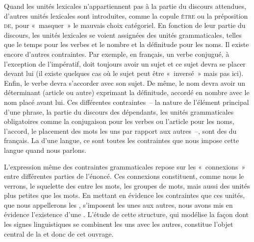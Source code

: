 Quand les unités lexicales n’appartiennent pas à la partie du discours attendues, d’autres unités lexicales sont introduites, comme la copule \textsc{être} ou la préposition \textsc{de}, pour «~masquer~» le mauvais choix catégoriel. En fonction de leur partie du discours, les unités lexicales se voient assignées des unités grammaticales, telles que le temps pour les verbes et le nombre et la définitude pour les noms. Il existe encore d’autres contraintes. Par exemple, en français, un verbe conjugué, à l’exception de l’impératif, doit toujours avoir un sujet et ce sujet devra se placer devant lui (il existe quelques cas où le sujet peut être «~inversé~» mais pas ici). Enfin, le verbe devra s’accorder avec son sujet. De même, le nom devra avoir un déterminant (article ou autre) exprimant la définitude, accordé en nombre avec le nom placé avant lui. Ces différentes contraintes~– la nature de l’élément principal d’une phrase, la partie du discours des dépendants, les unités grammaticales obligatoires comme la conjugaison pour les verbes ou l’article pour les noms, l’accord, le placement des mots les uns par rapport aux autres~–, sont des  du français. La  d’une langue, ce sont toutes les contraintes que nous impose cette langue quand nous parlons.

L’expression même des contraintes grammaticales repose sur les «~connexions~» entre différentes parties de l’énoncé. Ces connexions constituent, comme nous le verrons, le squelette des  entre les mots, les groupes de mots, mais aussi des unités plus petites que les mots. En mettant en évidence les contraintes que ces unités, que nous appellerons les , s’imposent les unes aux autres, nous avons mis en évidence l’existence d’une . L’étude de cette structure, qui modélise la façon dont les signes linguistiques se combinent les uns avec les autres, constitue l’objet central de la  et donc de cet ouvrage.

